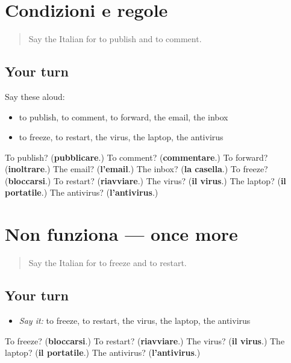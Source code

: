 \section[(dialogue)]{Condizioni e regole}

\label{lesson:IT-R404-ripasso-403-404}



\begin{quote}
Say the Italian for to publish and to comment.
\end{quote}

\subsection*{Your turn}
Say these aloud:

\begin{itemize}
\raggedright
  \item to publish, to comment, to forward, the email, the inbox
  \item to freeze, to restart, the virus, the laptop, the antivirus
\end{itemize}

\begin{tcolorbox}[breakable,colback=teal!4,colframe=teal!35!black,title={Before you move on}]
To publish? (\textbf{pubblicare}.) To comment? (\textbf{commentare}.) To forward? (\textbf{inoltrare}.) The email? (\textbf{l'email}.) The inbox? (\textbf{la casella}.) To freeze? (\textbf{bloccarsi}.) To restart? (\textbf{riavviare}.) The virus? (\textbf{il virus}.) The laptop? (\textbf{il portatile}.) The antivirus? (\textbf{l'antivirus}.)
\end{tcolorbox}
\section[(dialogue)]{Non funziona — once more}

\label{lesson:IT-R404-ripasso-final-404}



\begin{quote}
Say the Italian for to freeze and to restart.
\end{quote}

\subsection*{Your turn}
\begin{itemize}
\raggedright
  \item \emph{Say it:} to freeze, to restart, the virus, the laptop, the antivirus
\end{itemize}

\begin{tcolorbox}[breakable,colback=teal!4,colframe=teal!35!black,title={Before you move on}]
To freeze? (\textbf{bloccarsi}.) To restart? (\textbf{riavviare}.) The virus? (\textbf{il virus}.) The laptop? (\textbf{il portatile}.) The antivirus? (\textbf{l'antivirus}.)
\end{tcolorbox}

